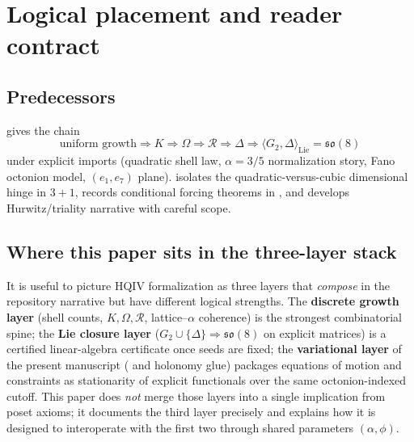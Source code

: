 \documentclass[11pt]{amsart}
\begin{document}
\maketitle



\section{Logical placement and reader contract}
\label{sec:placement}

\subsection{Predecessors}

\cite{hqiv-so8-paper} gives the chain
\[
\text{uniform growth} \Longrightarrow K \Longrightarrow \Omega \Longrightarrow \mathcal{R}
\Longrightarrow \Delta \Longrightarrow \langle G_2,\Delta\rangle_{\mathrm{Lie}}=\mathfrak{so}(8)
\]
under explicit imports (quadratic shell law, \(\alpha=3/5\) normalization story, Fano octonion model, \((e_1,e_7)\) plane). \cite{hqiv-3d-growth-paper} isolates the quadratic-versus-cubic dimensional hinge in \(3{+}1\), records conditional forcing theorems in , and develops Hurwitz/triality narrative with careful scope.

\subsection{Where this paper sits in the three-layer stack}

It is useful to picture HQIV formalization as three layers that \emph{compose} in the repository narrative but have different logical strengths. The \textbf{discrete growth layer} (shell counts, \(K,\Omega,\mathcal{R}\), lattice--\(\alpha\) coherence) is the strongest combinatorial spine; the \textbf{Lie closure layer} (\(G_2\cup\{\Delta\}\Rightarrow\mathfrak{so}(8)\) on explicit matrices) is a certified linear-algebra certificate once seeds are fixed; the \textbf{variational layer} of the present manuscript ( and holonomy glue) packages equations of motion and constraints as stationarity of explicit functionals over the same octonion-indexed cutoff. This paper does \emph{not} merge those layers into a single implication from poset axioms; it documents the third layer precisely and explains how it is designed to interoperate with the first two through shared parameters \((\alpha,\phi)\).
\end{document}
